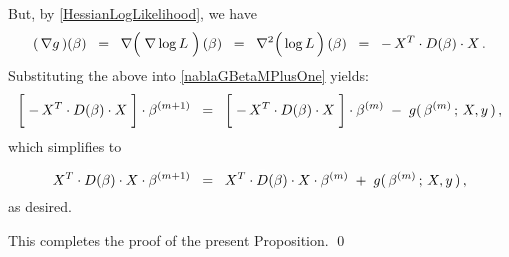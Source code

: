 \begin{enumerate}
	But, by \eqref{HessianLogLikelihood}, we have
	\begin{equation*}
	(\,\nabla g\,)(\beta)
	\;\; = \;\;
		\nabla\!\left(\;\overset{{\color{white}.}}{\nabla}\log L\;\right)(\beta)
	\;\; = \;\;
		\nabla^{2}\!\left(\,\overset{{\color{white}.}}{\log}\,L\,\right)(\beta)
	\;\; = \;\;
		-\, X^{T} \cdot D(\beta) \cdot X\,.
	\end{equation*}
	Substituting the above into \eqref{nablaGBetaMPlusOne} yields:
	\begin{equation*}
	\left[\; -\, X^{T} \cdot \overset{{\color{white}-}}{D}(\beta) \cdot X \;\right]
	\cdot
	\beta^{(m+1)}
	\;\; = \;\;
		\left[\; -\, X^{T} \cdot \overset{{\color{white}-}}{D}(\beta) \cdot X \;\right]
		\cdot
		\beta^{(m)}
		\; - \;
		g(\,\beta^{(m)}\,;\,X,y\,)\,,
	\end{equation*}
	which simplifies to
	\begin{equation*}
	X^{T} \cdot \overset{{\color{white}-}}{D}(\beta) \cdot X
	\cdot
	\beta^{(m+1)}
	\;\; = \;\;
		X^{T} \cdot \overset{{\color{white}-}}{D}(\beta) \cdot X
		\cdot
		\beta^{(m)}
		\; + \;
		g(\,\beta^{(m)}\,;\,X,y\,)\,,
	\end{equation*}
	as desired.
\end{enumerate}
This completes the proof of the present Proposition.
\qed


\renewcommand{\theenumi}{\roman{enumi}}
\renewcommand{\labelenumi}{\textnormal{(\theenumi)}$\;\;$}

